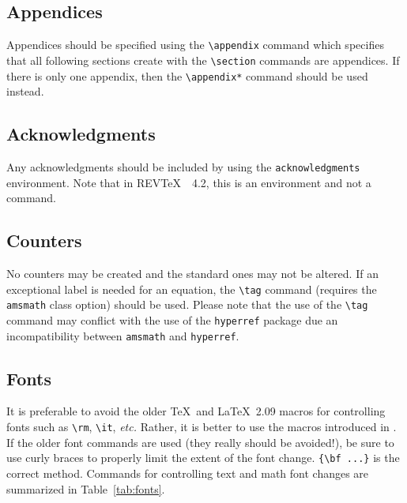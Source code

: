 \documentclass[twocolumn,secnumarabic,amssymb, nobibnotes, aps, prd]{revtex4-2}
\newcommand{\revtex}{REV\TeX\ }
\newcommand{\classoption}[1]{\texttt{#1}}
\newcommand{\macro}[1]{\texttt{\textbackslash#1}}
\newcommand{\m}[1]{\macro{#1}}
\newcommand{\env}[1]{\texttt{#1}}
\begin{document}
\subsection{Appendices}
Appendices should be specified using the \m{appendix} command which
specifies that all following sections create with the \m{section}
commands are appendices. If there is only one appendix, then the
\m{appendix*} command should be used instead.

\subsection{Acknowledgments}
Any acknowledgments should be included by using the
\env{acknowledgments} environment. Note that in \revtex~4.2, this is
an environment and not a command.

\subsection{Counters}
No counters may be created and the standard ones may not be
altered. If an exceptional label is needed for an equation, the \m{tag}
command (requires the \classoption{amsmath} class option) should be used. Please
note that the use of the \m{tag} command may conflict with the use of the \classoption{hyperref} package
due an incompatibility between \classoption{amsmath} and \classoption{hyperref}.

\subsection{Fonts}
It is preferable to avoid the older \TeX\ and \LaTeX\ 2.09 macros for
controlling fonts such as \m{rm}, \m{it}, \textit{etc.} Rather, it is
better to use the macros introduced in \LaTeXe.  If the older font
commands are used (they really should be avoided!), be sure to use
curly braces to properly limit the extent of the font
change. \verb+{\bf ...}+ is the correct method.
Commands for controlling text and math font changes are summarized in
Table~\ref{tab:fonts}.
\end{document}
